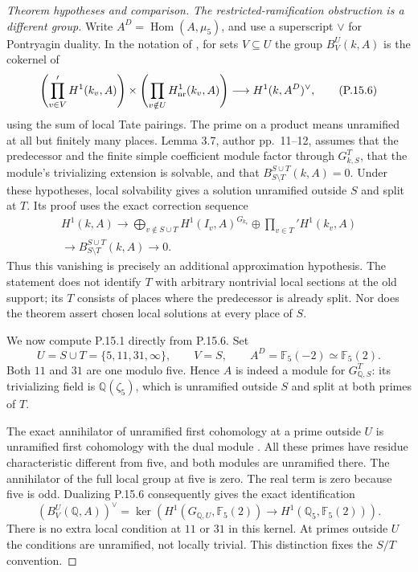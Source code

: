 \begin{proof}[Theorem hypotheses and comparison]
\emph{The restricted-ramification obstruction is a different group.}
Write $A^D=\operatorname{Hom}(A,\mu_5)$, and use a superscript
$\vee$ for Pontryagin duality. In the notation of
\citet[Definition 3.1 and Lemma 3.2, author pp.~8--9]{LitLiu2024},
for sets $V\subseteq U$ the group $B^U_V(k,A)$ is the cokernel of
\[
 \left(\prod_{v\in V}'H^1(k_v,A)\right)
 \times\left(\prod_{v\notin U}H^1_{\rm nr}(k_v,A)\right)
 \longrightarrow H^1(k,A^D)^\vee,                              \tag{P.15.6}
\]
using the sum of local Tate pairings. The prime on a product
means unramified at all but finitely many places. Lemma 3.7,
author pp.~11--12, assumes that the predecessor and the finite
simple coefficient module factor through $G_{k,S}^{T}$,
that the module's trivializing extension is solvable, and that
$B^{S\cup T}_{S\setminus T}(k,A)=0$. Under these hypotheses,
local solvability gives a solution unramified outside $S$ and
split at $T$. Its proof uses the exact correction sequence
\[
 \begin{gathered}
 H^1(k,A)\longrightarrow
 \bigoplus_{v\notin S\cup T}H^1(I_v,A)^{G_{k_v}}
       \oplus\prod_{v\in T}'H^1(k_v,A)\\
 \longrightarrow B^{S\cup T}_{S\setminus T}(k,A)
 \longrightarrow0.
 \end{gathered}
 \tag{P.15.7}
\]
Thus this vanishing is precisely an additional approximation
hypothesis. The statement does not identify $T$ with arbitrary
nontrivial local sections at the old support; its $T$ consists of
places where the predecessor is already split. Nor does the
theorem assert chosen local solutions at every place of $S$.

We now compute P.15.1 directly from P.15.6. Set
\[
 U=S\cup T=\{5,11,31,\infty\},\qquad V=S,
 \qquad A^D=\mathbb F_5(-2)\simeq\mathbb F_5(2).
\]
Both $11$ and $31$ are one modulo five. Hence $A$ is indeed
a module for $G_{\mathbb Q,S}^{T}$: its trivializing field is
$\mathbb Q(\zeta_5)$, which is unramified outside $S$ and
split at both primes of $T$.

The exact annihilator of unramified first cohomology at a
prime outside $U$ is unramified first cohomology with the dual
module \citep[I.2.6, pp.~30--31]{CohMilneADT}. All these primes
have residue characteristic different from five, and both
modules are unramified there. The annihilator of the full
local group at five is zero. The real term is zero because
five is odd. Dualizing P.15.6 consequently gives the exact
identification
\[
 \left(B^U_V(\mathbb Q,A)\right)^\vee
   =\ker\left(
       H^1(G_{\mathbb Q,U},\mathbb F_5(2))
        \longrightarrow H^1(\mathbb Q_5,\mathbb F_5(2))
         \right).                                             \tag{P.15.8}
\]
There is no extra local condition at $11$ or $31$ in this
kernel. At primes outside $U$ the conditions are unramified,
not locally trivial. This distinction fixes the $S/T$ convention.


\end{proof}
